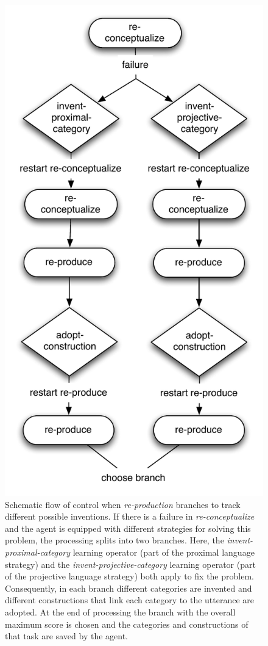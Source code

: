 \begin{figure} 
\begin{center}
\includegraphics[width=0.5\columnwidth]{figs/re-production-branching}
\end{center}
\caption[Schematic flow of control when \emph{re-production} branches]{%
Schematic flow of control when \emph{re-production} branches to track
different possible inventions. If there is a failure in \emph{re-conceptualize} and
the agent is equipped with different strategies for solving this problem, the processing
splits into two branches. Here, the \emph{invent-proximal-category} learning operator
(part of the proximal language strategy) and the 
\emph{invent-projective-category} learning operator 
(part of the projective language strategy) both apply to 
fix the problem. Consequently, in each branch different
categories are invented and different constructions that 
link each category to the utterance are adopted.
At the end of processing the branch with the overall 
maximum score is chosen and the categories
and constructions of that task are saved by the agent.}
\label{f:re-production-branching}
\end{figure}


